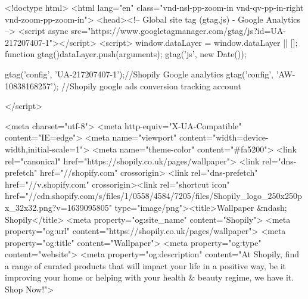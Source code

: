 <!doctype html>
<html lang="en" class="vnd-nsl-pp-zoom-in vnd-qv-pp-in-right vnd-zoom-pp-zoom-in">
<head><!-- Global site tag (gtag.js) - Google Analytics -->
<script async src="https://www.googletagmanager.com/gtag/js?id=UA-217207407-1"></script>
<script>
  window.dataLayer = window.dataLayer || [];
  function gtag(){dataLayer.push(arguments);}
  gtag('js', new Date());

  gtag('config', 'UA-217207407-1');//Shopily Google analytics 
gtag('config', 'AW-10838168257');  //Shopily google ads conversion tracking account

</script>

  <meta charset="utf-8">
  <meta http-equiv="X-UA-Compatible" content="IE=edge">
  <meta name="viewport" content="width=device-width,initial-scale=1">
  <meta name="theme-color" content="#fa5200">
  <link rel="canonical" href="https://shopily.co.uk/pages/wallpaper">
  <link rel="dns-prefetch" href="//shopify.com" crossorigin>
  <link rel="dns-prefetch" href="//v.shopify.com" crossorigin><link rel="shortcut icon" href="//cdn.shopify.com/s/files/1/0558/4584/7205/files/Shopily_logo_250x250px_32x32.png?v=1639095805" type="image/png"><title>Wallpaper
&ndash; Shopily</title>
  <meta property="og:site_name" content="Shopily">
<meta property="og:url" content="https://shopily.co.uk/pages/wallpaper">
<meta property="og:title" content="Wallpaper">
<meta property="og:type" content="website">
<meta property="og:description" content="At Shopily,  find a range of curated products
that will impact your life in a positive way,
be it improving your home or helping with your
health & beauty regime, we have it. Shop Now!">

